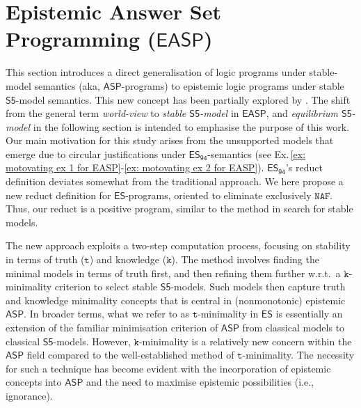 \documentclass[submission,copyright,creativecommons]{eptcs}
\newcommand{\logic}[1]  { \ensuremath{\mathsf{#1}} }
\newcommand{\sfive}  { \logic{S5} }
\newcommand{\ASP}  { \logic{ASP} }
\newcommand{\ES}  { \logic{ES} }
\newcommand{\EASP}  { \logic{EASP} }
\newcommand{\naf}  { \texttt{NAF} }
\newcommand{\ESdoksandort}  { \logic{ES_{\scriptscriptstyle{94}} } }
\begin{document}
\section{Epistemic Answer Set Programming (\texorpdfstring{$\EASP$}{EASP})}
\label{sec:EpisASP}
This section introduces a direct generalisation of logic programs under stable-model
semantics (aka, $\ASP$-programs) to epistemic logic programs 
under stable $\sfive$-model semantics. This new concept has been partially explored 
by \cite{Su19jelia}.
The shift from the general term \emph{world-view} to
\emph{stable $\sfive$-model} in $\EASP$, and \emph{equilibrium $\sfive$-model} 
in the following section is intended to emphasise the purpose of this work.
Our main motivation for this study arises from the unsupported models that emerge
due to circular justifications under $\ESdoksandort$-semantics 
(see Ex.\,\ref{ex: motovating ex 1 for EASP}-\ref{ex: motovating ex 2 for EASP}).
$\ESdoksandort$'s reduct definition deviates somewhat from the traditional approach.
We here propose a new reduct definition for $\ES$-programs,
oriented to eliminate exclusively $\naf$. Thus, our reduct is a positive program, 
similar to the method in search for stable models. 

The new approach exploits a two-step computation process, 
focusing on stability in terms of truth ($\texttt{t}$) and knowledge ($\texttt{k}$). 
The method involves finding the minimal models in terms of truth first, and then 
refining them further w.r.t.\ a $\texttt{k}$-minimality criterion 
to select stable $\sfive$-models. Such models then capture truth and knowledge minimality concepts that is central in (nonmonotonic) epistemic $\ASP$. 
In broader terms, 
what we refer to as $\texttt{t}$-minimality in $\ES$ is essentially an extension
of the familiar minimisation criterion of $\ASP$ from classical models to classical 
$\sfive$-models. However, $\texttt{k}$-minimality is a relatively new concern 
within the $\ASP$ field compared to the well-established method of $\texttt{t}$-minimality. 
The necessity for such a technique has become evident 
with the incorporation of epistemic 
concepts into $\ASP$ and the need to 
maximise epistemic possibilities (i.e., ignorance).
\end{document}
